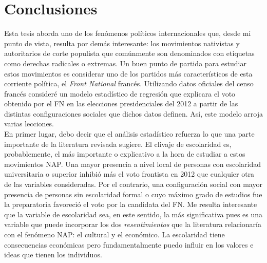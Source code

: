 \chapter{Conclusiones}

Esta tesis aborda uno de los fenómenos políticos internacionales que, desde mi punto de vista, resulta por demás interesante: los movimientos nativistas y autoritarios de corte populista que comúnmente son denominados con etiquetas como derechas radicales o extremas. Un buen punto de partida para estudiar estos movimientos es considerar uno de los partidos más característicos de esta corriente política, el \textit{Front National} francés. Utilizando datos oficiales del censo francés consideré un modelo estadístico de regresión que explicara el voto obtenido por el FN en las elecciones presidenciales del 2012 a partir de las distintas configuraciones sociales que dichos datos definen. Así, este modelo arroja varias lecciones.\\

En primer lugar, debo decir que el análisis estadístico refuerza lo que una parte importante de la literatura revisada sugiere. El clivaje de escolaridad es, probablemente, el más importante o explicativo a la hora de estudiar a estos movimientos NAP. Una mayor presencia a nivel local de personas con escolaridad universitaria o superior inhibió más el voto frontista en 2012 que cualquier otra de las variables consideradas. Por el contrario, una configuración social con mayor presencia de personas sin escolaridad formal o cuyo máximo grado de estudios fue la preparatoria favoreció el voto por la candidata del FN. Me resulta interesante que la variable de escolaridad sea, en este sentido, la más significativa pues es una variable que puede incorporar los dos \textit{resentimientos} que la literatura relacionaría con el fenómeno NAP: el cultural y el económico. La escolaridad tiene consecuencias económicas pero fundamentalmente puedo influir en los valores e ideas que tienen los individuos.\\

